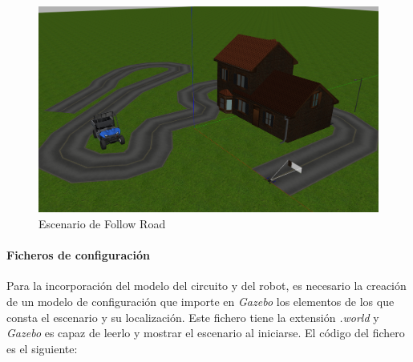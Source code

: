 \begin{figure}[H]
  \begin{center}
    \includegraphics[width=0.9\linewidth]{figures/mundo_fr.png}
		\caption{Escenario de Follow Road}
		\label{fig.mundo_fr}
		\end{center}
\end{figure}

\paragraph{Ficheros de configuración} \label{sec.launch_fr}
Para la incorporación del modelo del circuito y del robot, es necesario la creación de un modelo de configuración que importe en \textit{Gazebo} los elementos de los que consta el escenario y su localización. Este fichero tiene la extensión \textit{.world} y \textit{Gazebo} es capaz de leerlo y mostrar el escenario al iniciarse.
El código del fichero es el siguiente:

